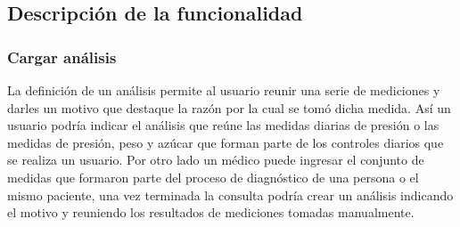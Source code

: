 {\scriptsize
	\begin{center} %
		\centering
	\end{center}
}

\begin{comment}
denominación del programa, caso de uso del que proviene, fecha de inicio de la programación, fecha de finalización, casos de prueba utilizados, clases involucradas, nombre y apellido del programador, del usuario que aprobó
\end{comment}

\subsection{Descripción de la funcionalidad} %
\subsubsection{Cargar análisis}

 La definición de un análisis permite al usuario reunir una serie de mediciones y darles un motivo que destaque la razón por la cual se tomó dicha medida. Así un usuario podría indicar el análisis que reúne las medidas diarias de presión o las medidas de presión, peso y azúcar que forman parte de los controles diarios que se realiza un usuario. Por otro lado un médico puede ingresar el conjunto de medidas que formaron parte del proceso de diagnóstico de una persona o el mismo paciente, una vez terminada la consulta podría crear un análisis indicando el motivo y reuniendo los resultados de mediciones tomadas manualmente.

